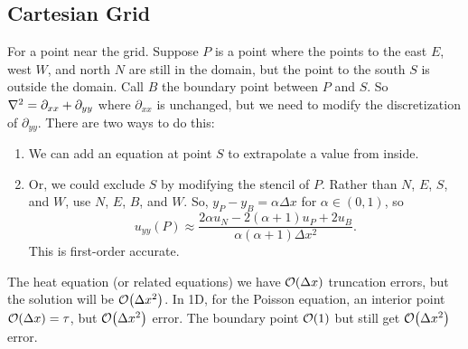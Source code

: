 \documentclass{article}
\newcommand{\Dx}{\Delta x}
\begin{document}
        \subsection{Cartesian Grid}
            \begin{figure}[ht!]
                \centering
                \hfill
            \end{figure}
            For a point near the grid.  Suppose $P$ is a point where the points to the east $E$, west $W$, and north $N$ are still in the domain, but the point to the south $S$ is outside the domain.  Call $B$ the boundary point between $P$ and $S$.  So $\laplacian = \partial_{xx} + \partial_{yy}$ where $\partial_{xx}$ is unchanged, but we need to modify the discretization of $\partial_{yy}$.  There are two ways to do this:
            \begin{enumerate}[\ \ (a)]
                \item We can add an equation at point $S$ to extrapolate a value from inside.
                \item Or, we could exclude $S$ by modifying the stencil of $P$.  Rather than $N$, $E$, $S$, and $W$, use $N$, $E$, $B$, and $W$.  So, $y_P - y_B = \alpha \Dx$ for $\alpha \in (0,1)$, so $$u_{yy}(P) \approx \frac{2\alpha u_N - 2(\alpha + 1)u_P + 2u_B}{\alpha(\alpha + 1)\Dx^2}.$$  This is first-order accurate.
            \end{enumerate}
            The heat equation (or related equations) we have $\order{\Dx}$ truncation errors, but the solution will be $\order{\Dx^2}$.  In 1D, for the Poisson equation, an interior point $\order{\Dx} = \tau$, but $\order{\Dx^2}$ error.  The boundary point $\order{1}$ but still get $\order{\Dx^2}$ error.
\end{document}
